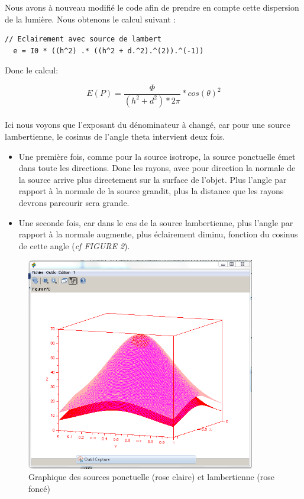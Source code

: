 \documentclass[a4paper,11pt]{article}
\begin{document}
  \newpage
  
  Nous avons à nouveau modifié le code afin de prendre en compte cette dispersion de la 
  lumière. Nous obtenons le calcul suivant :
  
  \begin{lstlisting}[caption=Nouvelle eclairement pour une source lambersienne]
  // Eclairement avec source de lambert
  e = I0 * ((h^2) .* ((h^2 + d.^2).^(2)).^(-1))
  \end{lstlisting}
  
  Donc le calcul:
  
  $$ E(P)=\frac{\Phi}{(h^{2}+d^{2})*2\pi}*cos(\theta)^{2} $$\\
  
  Ici nous voyons que l'exposant du dénominateur à changé, car pour une source lambertienne, 
  le cosinus de l'angle theta intervient deux fois.
  \begin{itemize}
    \item Une première fois, comme pour la source isotrope, la source ponctuelle émet dans toute 
    les directions. Donc les rayons, avec pour direction la normale de la source arrive plus 
    directement sur la surface de l'objet. Plus l'angle par rapport à la normale de la source 
    grandit, plus la distance que les rayons devrons parcourir sera grande.
    \item Une seconde fois, car dans le cas de la source lambertienne, plus l'angle par rapport 
    à la normale augmente, plus éclairement diminu, fonction du cosinus de cette angle 
    (\textit{cf FIGURE 2}).\\
  \end{itemize}
  
  \begin{figure}[H]
    \center
    \includegraphics[width=10cm]{../iso_lamb.PNG}
    \caption{Graphique des sources ponctuelle (rose claire) et lambertienne (rose foncé)}
  \end{figure}
  
\end{document}
